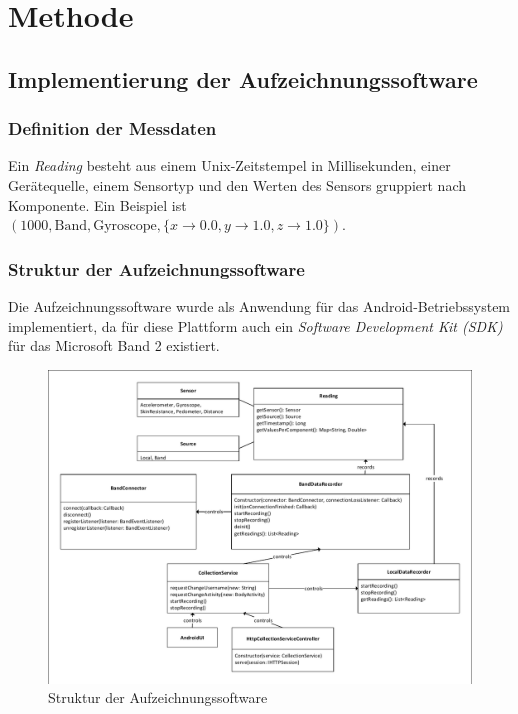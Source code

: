\chapter{Methode}
\label{chap:method}

\section{Implementierung der Aufzeichnungssoftware}
\subsection{Definition der Messdaten}
\begin{definition}
Ein \textit{Reading} besteht aus einem Unix-Zeitstempel in Millisekunden, einer Gerätequelle, einem Sensortyp und den Werten des Sensors gruppiert nach Komponente. Ein Beispiel ist $(1000, \text{Band}, \text{Gyroscope}, \{x \to 0.0, y \to 1.0, z \to 1.0\})$.
\end{definition}
\subsection{Struktur der Aufzeichnungssoftware}
Die Aufzeichnungssoftware wurde als Anwendung für das Android-Betriebssystem implementiert, da für diese Plattform auch ein \textit{Software Development Kit (SDK)} für das Microsoft Band 2 existiert.
\begin{figure}[htb]
\centering
\includegraphics[width=160mm, clip, trim=1mm 1mm 1mm 1mm]{img/app-structure}
\caption{Struktur der Aufzeichnungssoftware}
\label{fig:app-structure}
\end{figure}

